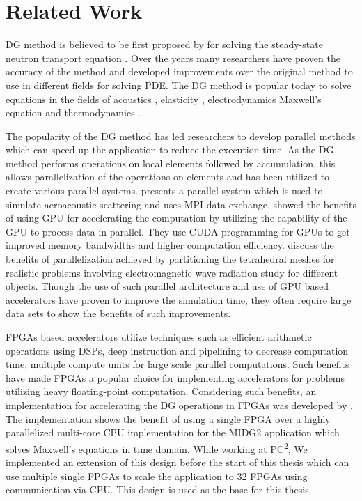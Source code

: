 \section{Related Work}

\ac{DG} method is believed to be first proposed by \textcite{reed_triangular_1973} for
solving the steady-state neutron transport equation \cite{hesthaven_nodal_2008}. Over the
years many researchers have proven the accuracy of the method and developed improvements
over the original method to use in different fields for solving \ac{PDE}. The \ac{DG} method
is popular today to solve equations in the fields of acoustics \cite{wilcox_high-order_2010,
atkins_quadrature-free_1998, toulopoulos_high-order_2006}, elasticity \cite{dumbser_arbitrary_2006,
kaser_arbitrary_2006, kaser_arbitrary_2007}, electrodynamics Maxwell’s equation \cite{busch_discontinuous_2011,
cohen_discontinuous_2006, busch_discontinuous_2011, cohen_spatial_2006, cockburn_locally_2004,
konig_discontinuous_2010} and thermodynamics \cite{collis_discontinuous_2002}.

The popularity of the \ac{DG} method has led researchers to develop parallel methods
which can speed up the application to reduce the execution time. As the DG method
performs operations on local elements followed by accumulation, this allows parallelization
of the operations on elements and has been utilized to create various parallel systems.
\textcite{baggag_parallel_1999} presents a parallel system which is used to simulate aeroacoustic
scattering and uses \ac{MPI} data exchange. \textcite{klockner_nodal_2009} showed the benefits
of using GPU for accelerating the computation by utilizing the capability of the GPU to
process data in parallel. They use CUDA programming for GPUs to get improved memory bandwidths
and higher computation efficiency. \textcite{bernacki_parallel_2006} discuss the benefits
of parallelization achieved by partitioning the tetrahedral meshes for realistic problems
involving electromagnetic wave radiation study for different objects. Though the use of such
parallel architecture and use of GPU based accelerators have proven
to improve the simulation time, they often require large data sets to show the benefits of
such improvements.

FPGAs based accelerators utilize techniques such as efficient arithmetic operations using DSPs,
deep instruction and pipelining to decrease computation time, multiple compute units for
large scale parallel computations.
Such benefits have made FPGAs a popular choice for implementing accelerators for
problems utilizing heavy floating-point computation. Considering such benefits,
an implementation for accelerating the \ac{DG} operations in FPGAs was
developed by \textcite{kenter_opencl-based_2018}. The implementation shows the benefit
of using a single FPGA over a highly parallelized multi-core CPU implementation for
the MIDG2 application which solves Maxwell’s equations in time domain. While working at
PC\textsuperscript{2}, We implemented an extension of this design before the start of this thesis
which can use multiple single FPGAs to scale the application to 32 FPGAs using
communication via CPU. This design is used as the base for this thesis.

